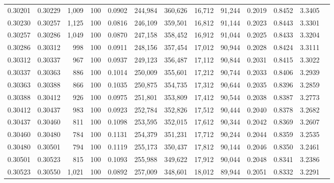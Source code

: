 \begin{tabular}{rrrrrrrrrrrrr}
0.30201 & 0.30229 & 1,009 & 100 &                                     0.0902 & 244,984 & 360,626 &  16,712 &  91,244 & 0.2019 & 0.8452 & 3.3405 \\
0.30230 & 0.30257 & 1,125 & 100 &                                     0.0816 & 246,109 & 359,501 &  16,812 &  91,144 & 0.2023 & 0.8443 & 3.3301 \\
0.30257 & 0.30286 & 1,049 & 100 &                                     0.0870 & 247,158 & 358,452 &  16,912 &  91,044 & 0.2025 & 0.8433 & 3.3204 \\
0.30286 & 0.30312 &   998 & 100 &                                     0.0911 & 248,156 & 357,454 &  17,012 &  90,944 & 0.2028 & 0.8424 & 3.3111 \\
0.30312 & 0.30337 &   967 & 100 &                                     0.0937 & 249,123 & 356,487 &  17,112 &  90,844 & 0.2031 & 0.8415 & 3.3022 \\
0.30337 & 0.30363 &   886 & 100 &                                     0.1014 & 250,009 & 355,601 &  17,212 &  90,744 & 0.2033 & 0.8406 & 3.2939 \\
0.30363 & 0.30388 &   866 & 100 &                                     0.1035 & 250,875 & 354,735 &  17,312 &  90,644 & 0.2035 & 0.8396 & 3.2859 \\
0.30388 & 0.30412 &   926 & 100 &                                     0.0975 & 251,801 & 353,809 &  17,412 &  90,544 & 0.2038 & 0.8387 & 3.2773 \\
0.30412 & 0.30437 &   983 & 100 &                                     0.0923 & 252,784 & 352,826 &  17,512 &  90,444 & 0.2040 & 0.8378 & 3.2682 \\
0.30437 & 0.30460 &   811 & 100 &                                     0.1098 & 253,595 & 352,015 &  17,612 &  90,344 & 0.2042 & 0.8369 & 3.2607 \\
0.30460 & 0.30480 &   784 & 100 &                                     0.1131 & 254,379 & 351,231 &  17,712 &  90,244 & 0.2044 & 0.8359 & 3.2535 \\
0.30480 & 0.30501 &   794 & 100 &                                     0.1119 & 255,173 & 350,437 &  17,812 &  90,144 & 0.2046 & 0.8350 & 3.2461 \\
0.30501 & 0.30523 &   815 & 100 &                                     0.1093 & 255,988 & 349,622 &  17,912 &  90,044 & 0.2048 & 0.8341 & 3.2386 \\
0.30523 & 0.30550 & 1,021 & 100 &                                     0.0892 & 257,009 & 348,601 &  18,012 &  89,944 & 0.2051 & 0.8332 & 3.2291 \\

\end{tabular}
